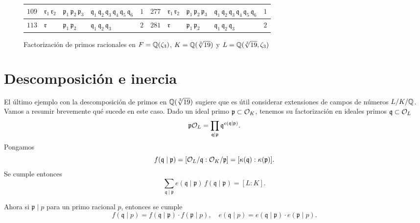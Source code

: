 \begin{figure}
\begin{center}
\begin{tabular}{x{0.75cm}x{1cm}x{1.25cm}x{2.5cm}x{0.75cm}x{0.75cm}x{1cm}x{1.25cm}x{2.5cm}x{0.75cm}}
      \hline
      $109$ & $\mathfrak{r}_1\,\mathfrak{r}_2$ & $\mathfrak{p}_1\,\mathfrak{p}_2\,\mathfrak{p}_3$ & $\mathfrak{q}_1\,\mathfrak{q}_2\,\mathfrak{q}_3\,\mathfrak{q}_4\,\mathfrak{q}_5\,\mathfrak{q}_6$ & $1$ & $277$ & $\mathfrak{r}_1\,\mathfrak{r}_2$ & $\mathfrak{p}_1\,\mathfrak{p}_2\,\mathfrak{p}_3$ & $\mathfrak{q}_1\,\mathfrak{q}_2\,\mathfrak{q}_3\,\mathfrak{q}_4\,\mathfrak{q}_5\,\mathfrak{q}_6$ & $1$ \tabularnewline
      \hline
      $113$ & $\mathfrak{r}$ & $\mathfrak{p}_1\,\mathfrak{p}_2$ & $\mathfrak{q}_1\,\mathfrak{q}_2\,\mathfrak{q}_3$ & $2$ & $281$ & $\mathfrak{r}$ & $\mathfrak{p}_1\,\mathfrak{p}_2$ & $\mathfrak{q}_1\,\mathfrak{q}_2\,\mathfrak{q}_3$ & $2$ \tabularnewline
      \hline
    \end{tabular}
  \end{center}

  \caption{Factorización de primos racionales en $F = \mathbb{Q} (\zeta_3)$, $K = \mathbb{Q} (\sqrt[3]{19})$ y $L = \mathbb{Q} (\sqrt[3]{19}, \zeta_3)$}
  \label{fig:cerradura-de-sqrt-19}
\end{figure}


\section{Descomposición e inercia}

El último ejemplo con la descomposición de primos en $\mathbb{Q} (\sqrt[3]{19})$
sugiere que es útil considerar extensiones de campos de números $L/K/\mathbb{Q}$.
Vamos a resumir brevemente qué sucede en este caso. Dado un ideal primo
$\mathfrak{p} \subset \mathcal{O}_K$, tenemos su factorización en ideales primos
$\mathfrak{q} \subset \mathcal{O}_L$
$$\mathfrak{p}\mathcal{O}_L = \prod_{\mathfrak{q} \mid \mathfrak{p}} \mathfrak{q}^{e (\mathfrak{q} \mid \mathfrak{p})}.$$
Pongamos
\[ f (\mathfrak{q} \mid \mathfrak{p})
   = [\mathcal{O}_L/\mathfrak{q} : \mathcal{O}_K/\mathfrak{p}]
   = [\kappa (\mathfrak{q}) : \kappa (\mathfrak{p})]. \]
Se cumple entonces
$$\sum_{\mathfrak{q} \mid \mathfrak{p}} e (\mathfrak{q} \mid \mathfrak{p}) \, f (\mathfrak{q} \mid \mathfrak{p}) = [L : K].$$

Ahora si $\mathfrak{p} \mid p$ para un primo racional $p$, entonces se cumple
\[ f (\mathfrak{q} \mid p) = f (\mathfrak{q} \mid \mathfrak{p}) \cdot f (\mathfrak{p} \mid p),
   \quad
   e (\mathfrak{q} \mid p) = e (\mathfrak{q} \mid \mathfrak{p}) \cdot e (\mathfrak{p} \mid p). \]

